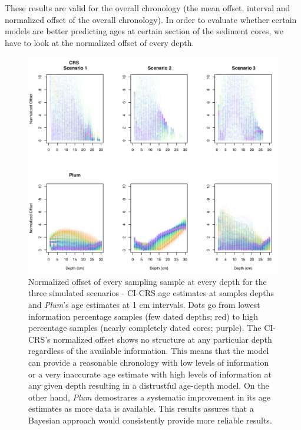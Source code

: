 \documentclass [10pt] {article}
\begin{document}
These results are valid for the overall chronology (the mean offset, interval and normalized offset of the overall chronology). 
In order to evaluate whether certain models are better predicting ages at certain section of the sediment cores, we have to look at the normalized offset of every depth. 





\begin{figure}[!]
	\begin{centering}
		\includegraphics[width=\linewidth]{depths.png}
		\caption{Normalized offset of every sampling sample at every depth for the three simulated scenarios - CI-CRS age estimates at samples depths and \textit{Plum}'s age estimates at 1 cm intervals. Dots go from lowest information percentage samples (few dated depths; red) to high percentage samples (nearly completely dated cores; purple). The CI-CRS's normalized offset shows no structure at any particular depth regardless of the available information. This means that the model can provide a reasonable chronology with low levels of information or a very inaccurate age estimate with high levels of information at any given depth resulting in a distrustful age-depth model. On the other hand, \textit{Plum} demostrares a systematic improvement in its age estimates as more data is available. This results assures that a Bayesian approach would consistently provide more reliable results.     }
		\label{fig:depths}
	\end{centering}
\end{figure}
\end{document}
